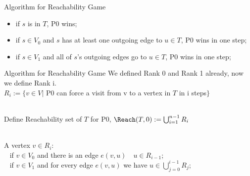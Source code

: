 \begin{frame}{Algorithm for Reachability Game}
\begin{figure}
    \centering
    \begin{adjustbox}{width=0.3\textwidth}
    \end{adjustbox}
\end{figure}
    \begin{itemize}
        \item if $s$ is in $T$, P0 wins;
        \item if $s\in V_0$ and $s$ has at least one outgoing edge to $u\in T$, P0 wins in one step;
        \item if $s\in V_1$ and all of $s$'s outgoing edges go to $u\in T$, P0 wins in one step;
    \end{itemize}
\end{frame}
\begin{frame}{Algorithm for Reachability Game}
    We defined Rank 0 and Rank 1 already, now we define Rank i.\\
    
    $R_i:=\{v\in V|$ P0 can force a visit from v to a vertex in $T$ in i steps$\}$\\~
    
    Define Reachability set of $T$ for P0, $\Reach(T,0) := \bigcup_{i=1}^{n-1}R_i$\\~
    
    
        A vertex $v\in R_i$: \\~
            if $v \in V_0$ and there is an edge $e(v,u)\quad u\in R_{i-1}$;\\~
            if $v \in V_1$ and for every edge $e(v,u)$ we have $u\in \bigcup_{j=0}^{i-1} R_j$;\\
        
\end{frame}
